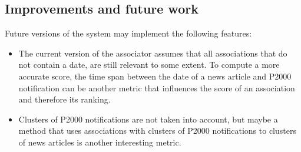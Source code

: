 \subsection{Improvements and future work}
Future versions of the system may implement the following features:
\begin{itemize}
\item The current version of the associator assumes that all associations that do not contain a date, are still relevant to some extent. To compute a more accurate score, the time span between the date of a news article and P2000 notification can be another metric that influences the score of an association and therefore its ranking.
\item Clusters of P2000 notifications are not taken into account, but maybe a method that uses associations with clusters of P2000 notifications to clusters of news articles is another interesting metric.
\end{itemize}

